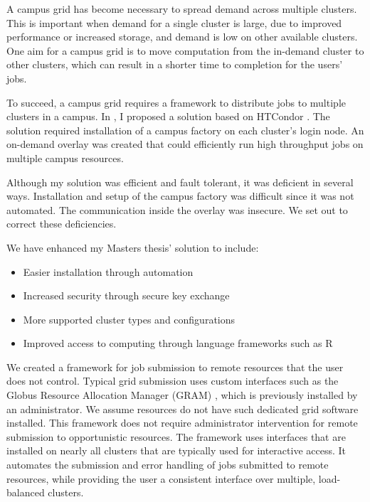 A campus grid has become necessary to spread demand across multiple clusters.  This is important when demand for a single cluster is large, due to improved performance or increased storage, and demand is low on other available clusters.  One aim for a campus grid is to move computation from the in-demand cluster to other clusters, which can result in a shorter time to completion for the users' jobs.

To succeed, a campus grid requires a framework to distribute jobs to multiple clusters in a campus.  In \cite{weitzel2011campus}, I proposed a solution based on HTCondor \cite{litzkow1988condor}.  The solution required installation of a campus factory \cite{website:campusfactory} on each cluster's login node.  An on-demand overlay was created that could efficiently run high throughput jobs on multiple campus resources.  

Although my solution was efficient and fault tolerant, it was deficient in several ways.  Installation and setup of the campus factory was difficult since it was not automated.  The communication inside the overlay was insecure.  We set out to correct these deficiencies.


We have enhanced my Masters thesis' solution to include:
\begin{itemize}
\item Easier installation through automation
\item Increased security through secure key exchange
\item More supported cluster types and configurations
\item Improved access to computing through language frameworks such as R \cite{team2005r}
\end{itemize}

We created a framework for job submission to remote resources that the user does not control.  Typical grid submission uses custom interfaces such as the Globus Resource Allocation Manager (GRAM) \cite{foster1999globus}, which is previously installed by an administrator.  We assume resources do not have such dedicated grid software installed.  This framework does not require administrator intervention for remote submission to opportunistic resources.  The framework uses interfaces that are installed on nearly all clusters that are typically used for interactive access.  It automates the submission and error handling of jobs submitted to remote resources, while providing the user a consistent interface over multiple, load-balanced clusters.

